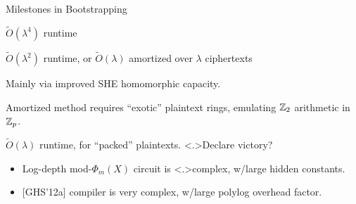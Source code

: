 \documentclass[shadow,xcolor=pdftex,svgnames,table,t]{beamer}
\begin{document}
\begin{frame}[label=great]{Milestones in Bootstrapping}
  \begin{description}
  \item<+->[[Gen'09{]}:] $\tilde{O}(\lambda^{4})$ runtime

    \medskip
  \item<+->[[BGV'12{]}:] $\tilde{O}(\lambda^{2})$ runtime, or
    $\tilde{O}(\lambda)$ amortized over $\lambda$ ciphertexts

    \onslide<+->
    \medskip
    Mainly via improved SHE homomorphic capacity.

    \medskip Amortized method requires ``exotic'' plaintext rings,
    emulating $\mathbb{Z}_{2}$ arithmetic in $\mathbb{Z}_{p}$.

    \medskip 
  \item<+->[[GHS'12b{]}:] $\tilde{O}(\lambda)$ runtime, for ``packed''
    plaintexts.  \alert<.>{Declare victory?}
  \end{description}
  \onslide<+->
  \begin{center}
  \end{center}
  \begin{itemize}
  \item<+->[\RedCross] Log-depth mod-$\Phi_{m}(X)$ circuit is
    \alert<.>{complex}, w/large hidden constants.
  \item<+->[\RedCross\RedCross] {\footnotesize [GHS'12a]} compiler is
    \alert{very complex}, w/\alert{large polylog overhead} factor.
  \end{itemize}
\end{frame}
\end{document}
